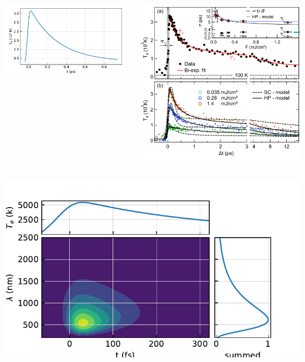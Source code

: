 \begin{frame}
	\begin{columns}
		\includegraphics[width=\textwidth]{../model/figures/temperature stange_hot_2015.pdf}

		\includegraphics[width=\textwidth]{./figures/stange_hot_2015.png}
	\end{columns}
\end{frame}

\begin{frame}
	\centering
	\includegraphics[width=.8\textwidth]{../model/figures/steak view.pdf}
\end{frame}
